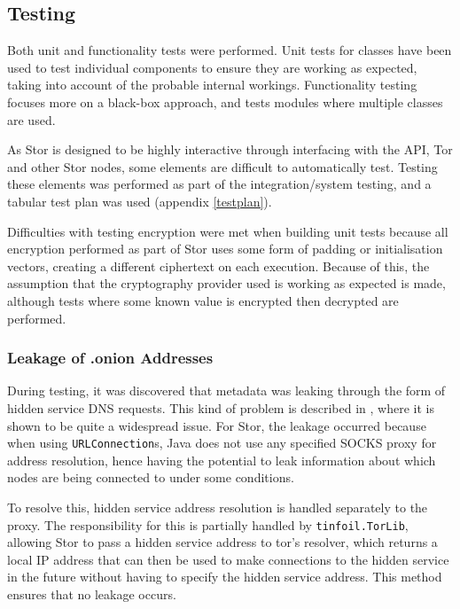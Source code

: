 	\subsection{Testing}
		Both unit and functionality tests were performed. Unit tests for classes have been used to test individual components to ensure they are working as expected, taking into account of the probable internal workings. Functionality testing focuses more on a black-box approach, and tests modules where multiple classes are used.
		
		
		As Stor is designed to be highly interactive through interfacing with the API, Tor and other Stor nodes, some elements are difficult to automatically test. Testing these elements was performed as part of the integration/system testing, and a tabular test plan was used (appendix \ref{testplan}).
		
		Difficulties with testing encryption were met when building unit tests because all encryption performed as part of Stor uses some form of padding or initialisation vectors, creating a different ciphertext on each execution. Because of this, the assumption that the cryptography provider used is working as expected is made, although tests where some known value is encrypted then decrypted are performed.
		
		
		\subsubsection*{Leakage of .onion Addresses}
			During testing, it was discovered that metadata was leaking through the form of hidden service DNS requests. This kind of problem is described in \cite{Thomas:2014:MLO:2665943.2665951}, where it is shown to be quite a widespread issue. For Stor, the leakage occurred because when using \texttt{URLConnection}s, Java does not use any specified SOCKS proxy for address resolution, hence having the potential to leak information about which nodes are being connected to under some conditions.
			
			To resolve this, hidden service address resolution is handled separately to the proxy. The responsibility for this is partially handled by \texttt{tinfoil.TorLib}, allowing Stor to pass a hidden service address to tor's resolver, which returns a local IP address that can then be used to make connections to the hidden service in the future without having to specify the hidden service address. This method ensures that no leakage occurs.